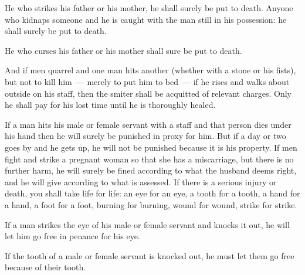 \begin{inparaenum}
     He who strikes his father or his mother, he shall surely be put to death.%
     Anyone who kidnaps someone and he is caught with the man still in his possession: he shall surely be put to death.%
    
     He who curses his father or his mother shall sure be put to death.%
    
     And if men quarrel and one man hits another (whether with a stone or his fists), but not to kill him~--- merely to put him to bed~---%
     if he rises and walks about outside on his staff, then the smiter shall be acquitted of relevant charges. Only he shall pay for his lost time until he is thoroughly healed.%
    
     If a man hits his male or female servant with a staff and that person dies under his hand then he will surely be punished in proxy for him.%
     But if a day or two goes by and he gets up, he will not be punished because it is his property.%
     If men fight and strike a pregnant woman so that she has a miscarriage, but there is no further harm, he will surely be fined according to what the husband deems right, and he will give according to what is assessed.%
     If there is a serious injury or death, you shall take life for life:%
     an eye for an eye, a tooth for a tooth, a hand for a hand, a foot for a foot,%
     burning for burning, wound for wound, strike for strike.%
    
     If a man strikes the eye of his male or female servant and knocks it out, he will let him go free in penance for his eye.%
    
     If the tooth of a male or female servant is knocked out, he must let them go free because of their tooth.%
    

\end{inparaenum}
